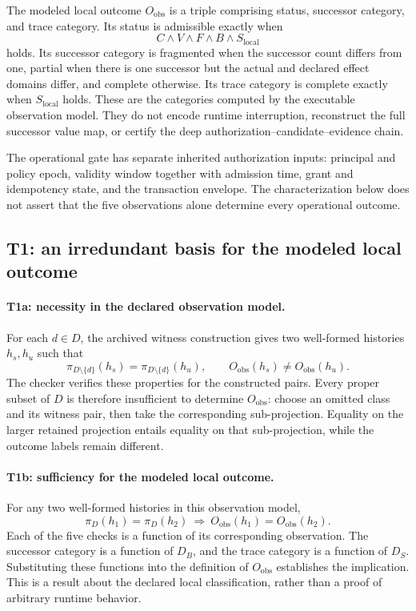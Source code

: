 The modeled local outcome $O_{\mathrm{obs}}$ is a triple comprising status, successor category, and trace category. Its status is admissible exactly when
\[
 C\land V\land F\land B\land S_{\mathrm{local}}
\]
holds. Its successor category is fragmented when the successor count differs from one, partial when there is one successor but the actual and declared effect domains differ, and complete otherwise. Its trace category is complete exactly when $S_{\mathrm{local}}$ holds. These are the categories computed by the executable observation model. They do not encode runtime interruption, reconstruct the full successor value map, or certify the deep authorization--candidate--evidence chain.

The operational gate has separate inherited authorization inputs: principal and policy epoch, validity window together with admission time, grant and idempotency state, and the transaction envelope. The characterization below does not assert that the five observations alone determine every operational outcome.

\subsection{T1: an irredundant basis for the modeled local outcome}
\label{app:t1}
\paragraph{T1a: necessity in the declared observation model.}
For each $d\in D$, the archived witness construction gives two well-formed histories $h_s,h_u$ such that
\[
 \pi_{D\setminus\{d\}}(h_s)=\pi_{D\setminus\{d\}}(h_u),
 \qquad
 O_{\mathrm{obs}}(h_s)\ne O_{\mathrm{obs}}(h_u).
\]
The checker verifies these properties for the constructed pairs. Every proper subset of $D$ is therefore insufficient to determine $O_{\mathrm{obs}}$: choose an omitted class and its witness pair, then take the corresponding sub-projection. Equality on the larger retained projection entails equality on that sub-projection, while the outcome labels remain different.

\paragraph{T1b: sufficiency for the modeled local outcome.}
For any two well-formed histories in this observation model,
\[
 \pi_D(h_1)=\pi_D(h_2)
 \ \Longrightarrow\
 O_{\mathrm{obs}}(h_1)=O_{\mathrm{obs}}(h_2).
\]
Each of the five checks is a function of its corresponding observation. The successor category is a function of $D_B$, and the trace category is a function of $D_S$. Substituting these functions into the definition of $O_{\mathrm{obs}}$ establishes the implication. This is a result about the declared local classification, rather than a proof of arbitrary runtime behavior.

